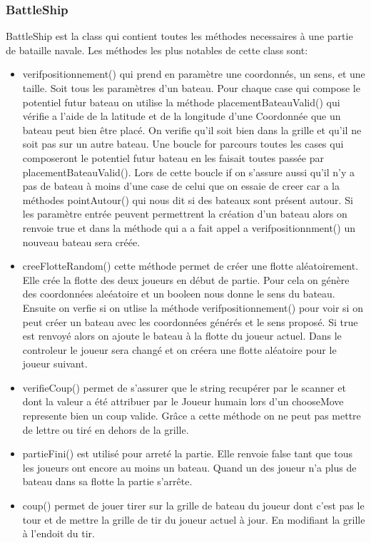 \documentclass[a4paper,12pt]{article} %
\begin{document}
\subsubsection{BattleShip}
BattleShip est la class qui contient toutes les méthodes necessaires à une partie de bataille navale. Les méthodes les plus notables de cette class sont:
\begin{itemize}
\item verifpositionnement() qui prend en paramètre une coordonnés, un sens, et une taille. Soit tous les paramètres d'un bateau. Pour chaque case qui compose le potentiel futur bateau on utilise la méthode placementBateauValid() qui vérifie a l'aide de la latitude et de la longitude d'une Coordonnée que un bateau peut bien être placé. On verifie qu'il soit bien dans la grille et qu'il ne soit
pas sur un autre bateau. Une boucle for parcours toutes les cases qui composeront le potentiel futur bateau en les faisait toutes passée par placementBateauValid(). Lors de cette boucle if on s'assure aussi qu'il n'y a pas de bateau à moins d'une case de celui que on essaie de creer car a la méthodes pointAutour() qui nous dit si des bateaux sont présent autour. Si les paramètre entrée peuvent permettrent la création d'un bateau alors on renvoie true et dans la méthode qui a a fait appel a verifpositionnment() un nouveau bateau sera créée. 
\item creeFlotteRandom() cette méthode permet de créer une flotte aléatoirement. Elle crée la flotte des deux joueurs en début de partie. Pour cela on génère des coordonnées aleéatoire et un booleen nous donne le sens du bateau. Ensuite on verfie si on utlise la méthode verifpositionnement() pour voir si on peut créer un bateau avec les coordonnées générés et le sens proposé. Si true est renvoyé alors on ajoute le bateau à la flotte du joueur actuel. Dans le controleur le joueur sera changé et on créera une flotte aléatoire pour le joueur suivant.
\item verifieCoup() permet de s'assurer que le string recupérer par le scanner et dont la valeur a été attribuer par le Joueur humain lors d'un chooseMove represente bien un coup valide. Grâce a cette méthode on ne peut pas mettre de lettre ou tiré en dehors de la grille.
\item partieFini() est utilisé pour arreté la partie. Elle renvoie false tant que tous les joueurs ont encore au moins un bateau. Quand un des joueur n'a plus de bateau dans sa flotte la partie 
s'arrête.
\item coup() permet de jouer tirer sur la grille de bateau du joueur dont c'est pas le tour et de mettre la grille de tir du joueur actuel à jour. En modifiant la grille à l'endoit du tir. 
\end{itemize}
\end{document}
